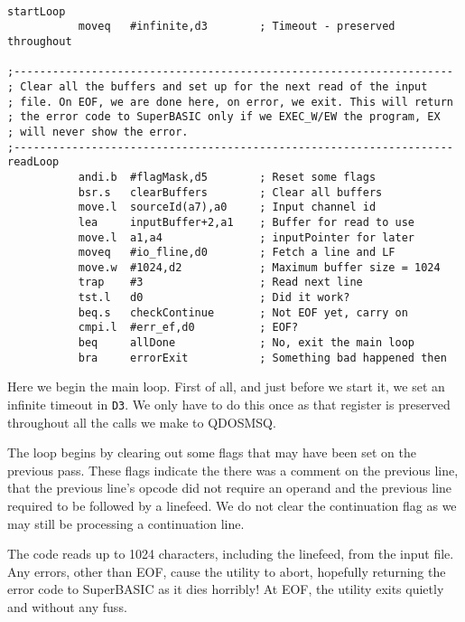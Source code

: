 \begin{lstlisting}[firstnumber=last,caption={ASMReformat Source - Main Loop}]

startLoop
           moveq   #infinite,d3        ; Timeout - preserved throughout

;--------------------------------------------------------------------
; Clear all the buffers and set up for the next read of the input
; file. On EOF, we are done here, on error, we exit. This will return
; the error code to SuperBASIC only if we EXEC_W/EW the program, EX
; will never show the error.
;--------------------------------------------------------------------
readLoop
           andi.b  #flagMask,d5        ; Reset some flags
           bsr.s   clearBuffers        ; Clear all buffers
           move.l  sourceId(a7),a0     ; Input channel id
           lea     inputBuffer+2,a1    ; Buffer for read to use
           move.l  a1,a4               ; inputPointer for later
           moveq   #io_fline,d0        ; Fetch a line and LF
           move.w  #1024,d2            ; Maximum buffer size = 1024
           trap    #3                  ; Read next line
           tst.l   d0                  ; Did it work?
           beq.s   checkContinue       ; Not EOF yet, carry on
           cmpi.l  #err_ef,d0          ; EOF?
           beq     allDone             ; No, exit the main loop
           bra     errorExit           ; Something bad happened then
\end{lstlisting}

Here we begin the main loop. First of all, and just before we start it, we set an infinite timeout in \texttt{D3}. We only have to do this once as that register is preserved throughout all the calls we make to QDOSMSQ.

The loop begins by clearing out some flags that may have been set on the previous pass. These flags indicate the there was a comment on the previous line, that the previous line's opcode did not require an operand and the previous line required to be followed by a linefeed. We do not clear the continuation flag as we may still be processing a continuation line.

The code reads up to 1024 characters, including the linefeed, from the input file. Any errors, other than EOF, cause the utility to abort, hopefully returning the error code to SuperBASIC as it dies horribly! At EOF, the utility exits quietly and without any fuss.

